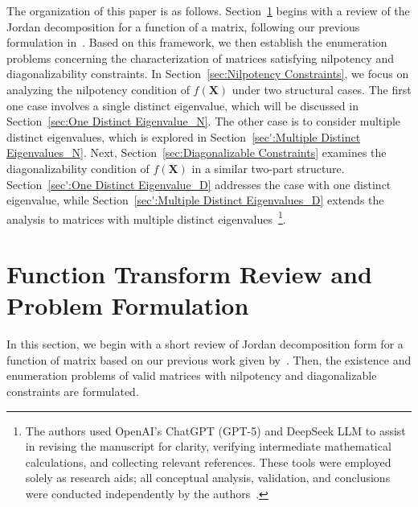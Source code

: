 \documentclass[11pt]{article}
\begin{document}
The organization of this paper is as follows. Section~\ref{sec:Function Transform Review} begins with a review of the Jordan decomposition for a function of a matrix, following our previous formulation in~\cite{chang2025matrixSNO}. Based on this framework, we then establish the enumeration problems concerning the characterization of matrices satisfying nilpotency and diagonalizability constraints. In Section~\ref{sec:Nilpotency Constraints}, we focus on analyzing the nilpotency condition of $f(\bm{X})$  under two structural cases. The first one case involves a single distinct eigenvalue, which will be discussed in Section~\ref{sec:One Distinct Eigenvalue_N}. The other case is to consider multiple distinct eigenvalues, which is explored in Section~\ref{sec':Multiple Distinct Eigenvalues_N}. Next, Section~\ref{sec:Diagonalizable Constraints} examines the diagonalizability condition of $f(\bm{X})$ in a similar two-part structure. Section~\ref{sec':One Distinct Eigenvalue_D} addresses the case with one distinct eigenvalue, while Section~\ref{sec':Multiple Distinct Eigenvalues_D} extends the analysis to matrices with multiple distinct eigenvalues~\footnote{The authors used OpenAI’s ChatGPT (GPT-5) and DeepSeek LLM to assist in revising the manuscript for clarity, verifying intermediate mathematical calculations, and collecting relevant references. These tools were employed solely as research aids; all conceptual analysis, validation, and conclusions were conducted independently by the authors~\cite{openai2025chatgpt,deepseek2025}.}.



\section{Function Transform Review and Problem Formulation}\label{sec:Function Transform Review}


In this section, we begin with a short review of Jordan decomposition form for a function of matrix based on our previous work given by~\cite{chang2025matrixSNO}. Then,  the existence and enumeration problems of valid matrices with nilpotency and diagonalizable constraints are formulated. 
\end{document}
